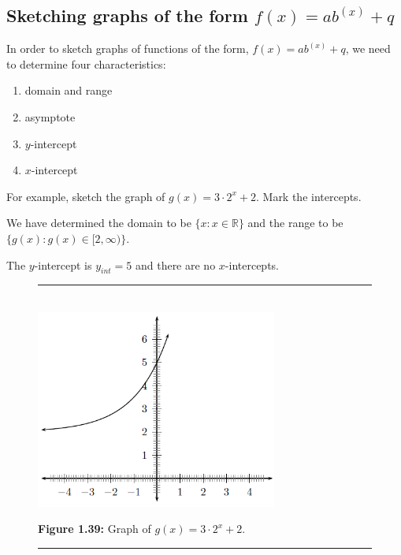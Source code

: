 \subsection*{Sketching graphs of the form $f(x)=a{b}^{(x)}+q$}
\nopagebreak
In order to sketch graphs of functions of the form, $f(x)=a{b}^{(x)}+q$, we need to determine four characteristics:\par 
\begin{enumerate}[noitemsep, label=\textbf{\arabic*}. ] 
\item domain and range
\item asymptote
\item $y$-intercept
\item $x$-intercept
\end{enumerate}
For example, sketch the graph of $g(x)=3\ensuremath{\cdot}{2}^{x}+2$. Mark the intercepts.\par 
We have determined the domain to be $\{x:x\in \mathbb{R}\}$ and the range to be $\{g(x):g(x)\in [2,\infty )\}$.\par 
The $y$-intercept is ${y}_{int}=5$ and there are no $x$-intercepts.\par 
\setcounter{subfigure}{0}
\begin{figure}[H] %
\begin{center}
\rule[.1in]{\figurerulewidth}{.005in} \\
\label{m39348*uid196!!!underscore!!!media}\label{m39348*uid196!!!underscore!!!printimage}\includegraphics[width=300px]{col11306.imgs/m39348_MG10C11_032.png} %
\vspace{2pt}
\vspace{\rubberspace}\par \begin{cnxcaption}
\small \textbf{Figure 1.39: }Graph of $g(x)=3\ensuremath{\cdot}{2}^{x}+2$.
\end{cnxcaption}
\vspace{.1in}
\rule[.1in]{\figurerulewidth}{.005in} \\
\end{center}
\end{figure}       
